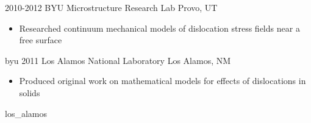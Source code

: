 \begin{entrylist}
\logoentry
{2010-2012}
{BYU Microstructure Research Lab}
{Provo, UT}
{
\begin{itemize}
	\item Researched continuum mechanical models of dislocation stress fields near a free surface
\end{itemize}
}
{byu}
\logoentry
{2011}
{Los Alamos National Laboratory}
{Los Alamos, NM}
{
\begin{itemize}
	\item Produced original work on mathematical models for effects of dislocations in solids
\end{itemize}
}
{los_alamos}
\end{entrylist}
